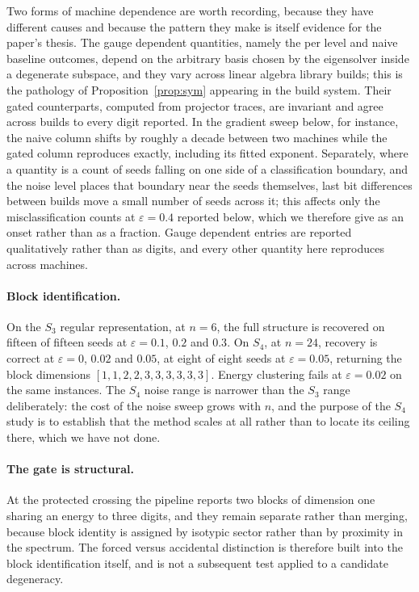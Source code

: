 \documentclass[10pt,a4paper]{amsart}
\begin{document}
Two forms of machine dependence are worth recording, because they have different
causes and because the pattern they make is itself evidence for the paper's
thesis. The gauge dependent quantities, namely the per level and naive baseline
outcomes, depend on the arbitrary basis chosen by the eigensolver inside a
degenerate subspace, and they vary across linear algebra library builds; this is
the pathology of Proposition~\ref{prop:sym} appearing in the build system. Their
gated counterparts, computed from projector traces, are invariant and agree
across builds to every digit reported. In the gradient sweep below, for instance,
the naive column shifts by roughly a decade between two machines while the gated
column reproduces exactly, including its fitted exponent. Separately, where a
quantity is a count of seeds falling on one side of a classification boundary,
and the noise level places that boundary near the seeds themselves, last bit
differences between builds move a small number of seeds across it; this affects
only the misclassification counts at $\varepsilon=0.4$ reported below, which we
therefore give as an onset rather than as a fraction. Gauge dependent entries are
reported qualitatively rather than as digits, and every other quantity here
reproduces across machines.

\paragraph{Block identification.}
On the $S_3$ regular representation, at $n=6$, the full structure is recovered on
fifteen of fifteen seeds at $\varepsilon=0.1$, $0.2$ and $0.3$. On $S_4$, at
$n=24$, recovery is correct at $\varepsilon=0$, $0.02$ and $0.05$, at eight of
eight seeds at $\varepsilon=0.05$, returning the block dimensions
$[1,1,2,2,3,3,3,3,3,3]$. Energy clustering fails at $\varepsilon=0.02$ on the
same instances. The $S_4$ noise range is narrower than the $S_3$ range
deliberately: the cost of the noise sweep grows with $n$, and the purpose of the
$S_4$ study is to establish that the method scales at all rather than to locate
its ceiling there, which we have not done.

\paragraph{The gate is structural.}
At the protected crossing the pipeline reports two blocks of dimension one
sharing an energy to three digits, and they remain separate rather than merging,
because block identity is assigned by isotypic sector rather than by proximity in
the spectrum. The forced versus accidental distinction is therefore built into
the block identification itself, and is not a subsequent test applied to a
candidate degeneracy.
\end{document}
